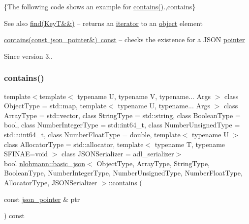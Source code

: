 \{The following code shows an example for {\ttfamily \mbox{\hyperlink{classnlohmann_1_1basic__json_a9286acdc0578fc66e9346323e69fc0e3}{contains()}}}.,contains\}

\begin{DoxySeeAlso}{See also}
\mbox{\hyperlink{classnlohmann_1_1basic__json_a89eb3928f57903677051c80534be9cb1}{find(\+Key\+T\&\&)}} -- returns an \mbox{\hyperlink{classnlohmann_1_1basic__json_a099316232c76c034030a38faa6e34dca}{iterator}} to an \mbox{\hyperlink{classnlohmann_1_1basic__json_a31f84ee15c4690ff705bed74736d04c6}{object}} element 

\mbox{\hyperlink{classnlohmann_1_1basic__json_ab23b04802eb9da97dc3f664e54e09cb3}{contains(const json\+\_\+pointer\&) const}} -- checks the existence for a J\+S\+ON \mbox{\hyperlink{classnlohmann_1_1basic__json_aefee1f777198c68724bd127e0c8abbe4}{pointer}}
\end{DoxySeeAlso}
\begin{DoxySince}{Since}
version 3.. 
\end{DoxySince}
\mbox{\label{classnlohmann_1_1basic__json_ab23b04802eb9da97dc3f664e54e09cb3}} 
\subsubsection{\texorpdfstring{contains()}{contains()}\hspace{0.1cm}{\footnotesize\ttfamily [2/2]}}
{\footnotesize\ttfamily template$<$template$<$ typename U, typename V, typename... Args $>$ class Object\+Type = std\+::map, template$<$ typename U, typename... Args $>$ class Array\+Type = std\+::vector, class String\+Type  = std\+::string, class Boolean\+Type  = bool, class Number\+Integer\+Type  = std\+::int64\+\_\+t, class Number\+Unsigned\+Type  = std\+::uint64\+\_\+t, class Number\+Float\+Type  = double, template$<$ typename U $>$ class Allocator\+Type = std\+::allocator, template$<$ typename T, typename S\+F\+I\+N\+A\+E=void $>$ class J\+S\+O\+N\+Serializer = adl\+\_\+serializer$>$ \\
bool \mbox{\hyperlink{classnlohmann_1_1basic__json}{nlohmann\+::basic\+\_\+json}}$<$ Object\+Type, Array\+Type, String\+Type, Boolean\+Type, Number\+Integer\+Type, Number\+Unsigned\+Type, Number\+Float\+Type, Allocator\+Type, J\+S\+O\+N\+Serializer $>$\+::contains (\begin{DoxyParamCaption}\item[{const \mbox{\hyperlink{classnlohmann_1_1basic__json_a6886a5001f5b449ad316101a311ce536}{json\+\_\+pointer}} \&}]{ptr }\end{DoxyParamCaption}) const\hspace{0.3cm}{\ttfamily [inline]}}



